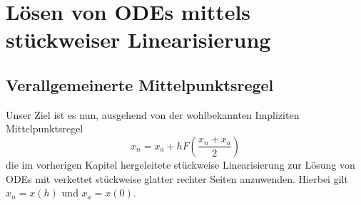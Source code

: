 \chapter{Lösen von ODEs mittels stückweiser Linearisierung}

\section{Verallgemeinerte Mittelpunktsregel}

Unser Ziel ist es nun, ausgehend von der wohlbekannten Impliziten Mittelpunktsregel
\[
 x_n  = x_a + hF\left( \frac{x_n + x_a}{2}\right)
\]
die im vorherigen Kapitel hergeleitete stückweise Linearisierung zur Lösung von ODEs mit verkettet stückweise glatter rechter Seiten anzuwenden.
Hierbei gilt $x_n = x(h)$ und $x_a = x(0)$.

